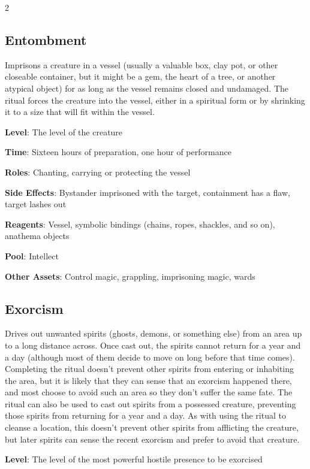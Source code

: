 \begin{multicols}{2}
\subsection{Entombment}

Imprisons a creature in a vessel (usually a valuable box, clay pot, or other closeable container, but it might be a gem, the heart of a tree, or another atypical object) for as long as the vessel remains closed and undamaged. The ritual forces the creature into the vessel, either in a spiritual form or by shrinking it to a size that will fit within the vessel. 

\textbf{Level}: The level of the creature 

\textbf{Time}: Sixteen hours of preparation, one hour of performance 

\textbf{Roles}: Chanting, carrying or protecting the vessel 

\textbf{Side Effects}: Bystander imprisoned with the target, containment has a flaw, target lashes out 

\textbf{Reagents}: Vessel, symbolic bindings (chains, ropes, shackles, and so on), anathema objects 

\textbf{Pool}: Intellect 

\textbf{Other Assets}: Control magic, grappling, imprisoning magic, wards

\subsection{Exorcism}

Drives out unwanted spirits (ghosts, demons, or something else) from an area up to a long distance across. Once cast out, the spirits cannot return for a year and a day (although most of them decide to move on long before that time comes). Completing the ritual doesn’t prevent other spirits from entering or inhabiting the area, but it is likely that they can sense that an exorcism happened there, and most choose to avoid such an area so they don’t suffer the same fate. The ritual can also be used to cast out spirits from a possessed creature, preventing those spirits from returning for a year and a day. As with using the ritual to cleanse a location, this doesn’t prevent other spirits from afflicting the creature, but later spirits can sense the recent exorcism and prefer to avoid that creature.

\textbf{Level}: The level of the most powerful hostile presence to be exorcised 


\end{multicols}
